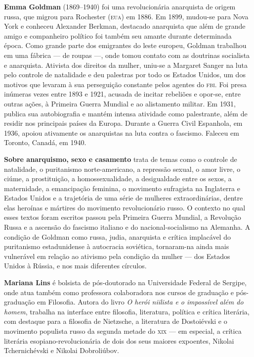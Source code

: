 \textbf{Emma Goldman} (1869–1940) foi uma revolucionária anarquista de origem russa, que migrou para Rochester (\textsc{eua}) em 1886. Em 1899, mudou-se para Nova York e conheceu Alexander Berkman, destacado anarquista que além de grande amigo e companheiro político foi também seu amante durante determinada época. Como grande parte dos emigrantes do leste europeu, Goldman trabalhou em uma fábrica --- de roupas ---, onde tomou contato com as doutrinas socialista e anarquista. Ativista dos direitos da mulher, uniu-se a Margaret Sanger na luta pelo controle de natalidade e deu palestras por todo os Estados Unidos, um dos motivos que levaram à sua perseguição constante pelos agentes do \textsc{fbi}. Foi presa inúmeras vezes entre 1893 e 1921, acusada de incitar rebeliões e opor-se, entre outras ações, à Primeira Guerra Mundial e ao alistamento militar. Em 1931, publica sua autobiografia e mantém intensa atividade como palestrante, além de residir nos principais países da Europa. Durante a Guerra Civil Espanhola, em 1936, apoiou ativamente os anarquistas na luta contra o fascismo. Faleceu em Toronto, Canadá, em 1940.

\textbf{Sobre anarquismo, sexo e casamento} trata de temas como o controle de natalidade, o puritanismo norte-americano, a repressão sexual, o amor livre, o ciúme, a prostituição, a homossexualidade, a desigualdade entre os sexos, a maternidade, a emancipação feminina, o movimento sufragista na Inglaterra e Estados Unidos e a trajetória de uma série de mulheres extraordinárias, dentre elas heroínas e mártires do movimento revolucionário russo. O contexto no qual esses textos foram escritos passou pela Primeira Guerra Mundial, a Revolução Russa e a ascensão do fascismo italiano e do nacional-socialismo na Alemanha. A condição de Goldman como russa, judia, anarquista e crítica implacável do puritanismo estadunidense à autocracia soviética, tornaram-na ainda mais vulnerável em relação ao ativismo pela condição da mulher --- dos Estados Unidos à Rússia, e nos mais diferentes círculos.

\textbf{Mariana Lins} é bolsista de pós-doutorado na Universidade Federal de Sergipe, onde atua também como professora colaboradora nos cursos de graduação e pós-graduação em Filosofia. Autora do livro \textit{O herói niilista e o impossível além do homem}, trabalha na interface entre filosofia, literatura, política e crítica literária, com destaque para a filosofia de Nietzsche, a literatura de Dostoiévski e o movimento populista russo da segunda metade do \textsc{xix} --- em especial, a crítica literária esopiano-revolucionária de dois dos seus maiores expoentes, Nikolai Tchernichévski e Nikolai Dobroliúbov.




